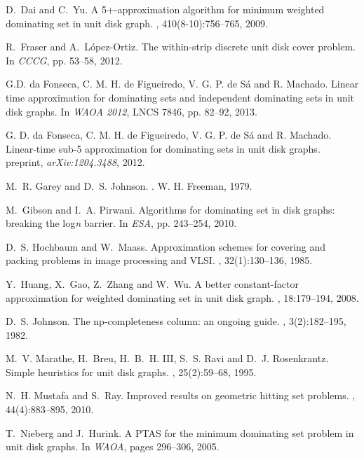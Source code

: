 \documentclass[a4paper,11pt]{article}
\begin{document}
\begin{thebibliography}{10}
D.~Dai and C.~Yu.
\newblock A 5+-approximation algorithm for minimum weighted
  dominating set in unit disk graph.
, 410(8-10):756--765, 2009.

R.~Fraser and A.~L{\'o}pez-Ortiz.
\newblock The within-strip discrete unit disk cover problem.
\newblock In {\em CCCG}, pp. 53--58, 2012.

G.D. da Fonseca, C. M. H. de Figueiredo, V. G. P. de S\'{a} and R. Machado.
\newblock Linear time approximation for dominating sets and independent dominating sets in unit disk graphs.
\newblock In {\em WAOA 2012}, LNCS 7846, pp. 82--92, 2013.

G. D. da Fonseca, C. M. H. de Figueiredo, V. G. P. de S\'{a} and R. Machado.
\newblock Linear-time sub-5 approximation for dominating sets in unit disk graphs.
\newblock preprint, {\em arXiv:1204.3488}, 2012.

M.~R. Garey and D.~S. Johnson.
.
\newblock W. H. Freeman, 1979.

M.~Gibson and I.~A. Pirwani.
\newblock Algorithms for dominating set in disk graphs: breaking the log{\it n}
  barrier.
\newblock In {\em ESA}, pp. 243--254, 2010.

D.~S. Hochbaum and W.~Maass.
\newblock Approximation schemes for covering and packing problems in image
  processing and VLSI.
, 32(1):130--136, 1985.

Y.~Huang, X.~Gao, Z.~Zhang and W.~Wu.
\newblock A better constant-factor approximation for weighted dominating set in
  unit disk graph.
, 18:179--194, 2008.

D.~S. Johnson.
\newblock The np-completeness column: an ongoing guide.
, 3(2):182--195, 1982.

M.~V. Marathe, H.~Breu, H.~B.~H. III, S.~S. Ravi and D.~J. Rosenkrantz.
\newblock Simple heuristics for unit disk graphs.
, 25(2):59--68, 1995.

N.~H. Mustafa and S.~Ray.
\newblock Improved results on geometric hitting set problems.
, 44(4):883--895, 2010.

T.~Nieberg and J.~Hurink.
\newblock A PTAS for the minimum dominating set problem in unit disk graphs.
\newblock In {\em WAOA}, pages 296--306, 2005.


\end{thebibliography}
\end{document}

